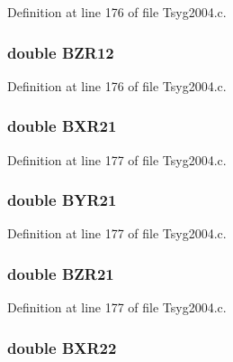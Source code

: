 Definition at line 176 of file Tsyg2004.c.\hypertarget{struct___t_s04_info_23500101452343c6ceff7f5d0acdfced}{
\subsubsection[{BZR12}]{\setlength{\rightskip}{0pt plus 5cm}double {\bf BZR12}}}
\label{struct___t_s04_info_23500101452343c6ceff7f5d0acdfced}




Definition at line 176 of file Tsyg2004.c.\hypertarget{struct___t_s04_info_a508ffc6a962d5f93b1084c889cb0fb5}{
\subsubsection[{BXR21}]{\setlength{\rightskip}{0pt plus 5cm}double {\bf BXR21}}}
\label{struct___t_s04_info_a508ffc6a962d5f93b1084c889cb0fb5}




Definition at line 177 of file Tsyg2004.c.\hypertarget{struct___t_s04_info_93d072e6ba972405e72ac04b6cbe06a4}{
\subsubsection[{BYR21}]{\setlength{\rightskip}{0pt plus 5cm}double {\bf BYR21}}}
\label{struct___t_s04_info_93d072e6ba972405e72ac04b6cbe06a4}




Definition at line 177 of file Tsyg2004.c.\hypertarget{struct___t_s04_info_cf104617807d9c28716d97945d8bdda9}{
\subsubsection[{BZR21}]{\setlength{\rightskip}{0pt plus 5cm}double {\bf BZR21}}}
\label{struct___t_s04_info_cf104617807d9c28716d97945d8bdda9}




Definition at line 177 of file Tsyg2004.c.\hypertarget{struct___t_s04_info_2e25e21de5a89d9a9cf3f39a9cdbf6e6}{
\subsubsection[{BXR22}]{\setlength{\rightskip}{0pt plus 5cm}double {\bf BXR22}}}
\label{struct___t_s04_info_2e25e21de5a89d9a9cf3f39a9cdbf6e6}




